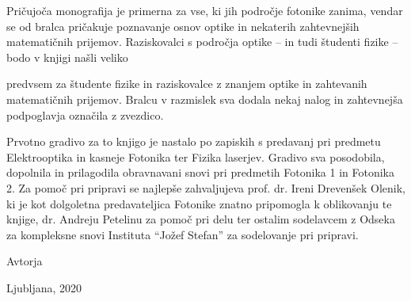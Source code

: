 \documentclass[11pt,fleqn]{book} %
\begin{document}
Pričujoča monografija je primerna za vse, ki jih področje fotonike zanima, 
vendar se od bralca pričakuje poznavanje osnov optike in nekaterih 
zahtevnejših matematičnih prijemov. Raziskovalci s področja optike 
-- in tudi študenti fizike -- bodo v knjigi našli veliko 

predvsem za študente fizike
in raziskovalce z znanjem optike in zahtevanih matematičnih prijemov. 
Bralcu v razmislek 
sva dodala nekaj nalog in zahtevnejša podpoglavja označila z zvezdico.

Prvotno gradivo za to knjigo je nastalo po zapiskih s predavanj pri predmetu 
Elektrooptika in kasneje Fotonika ter Fizika laserjev. Gradivo sva posodobila, dopolnila 
in prilagodila obravnavani snovi pri predmetih Fotonika 1 in Fotonika 2. 
Za pomoč pri pripravi se najlepše zahvaljujeva prof. dr. Ireni Drevenšek Olenik, ki je 
kot dolgoletna predavateljica Fotonike znatno pripomogla k oblikovanju te knjige,
dr. Andreju Petelinu za pomoč pri delu ter ostalim sodelavcem z Odseka za 
kompleksne snovi Instituta ``Jožef Stefan'' za sodelovanje pri pripravi.

\vspace{1em}

Avtorja

\hfill Ljubljana, 2020


\cleardoublepage
\thispagestyle{empty}
\mbox{}
\cleardoublepage












\end{document}
